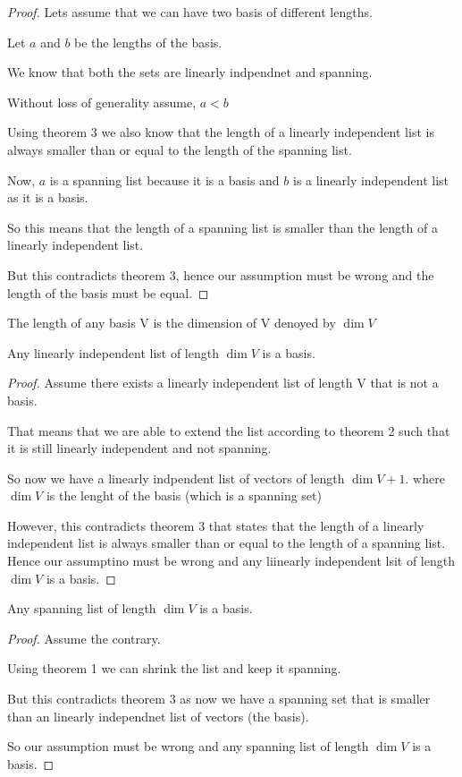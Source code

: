     \begin{proof}
        Lets assume that we can have two basis of different lengths.

        Let $a$ and $b$ be the lengths of the basis.

        We know that both the sets are linearly indpendnet and spanning. 

        Without loss of generality assume, $a < b$
        
        Using theorem 3 we also know that the length of a linearly independent list is always smaller than or equal to the length of the spanning list.

        Now, $a$ is a spanning list because it is a basis and  $b$ is a linearly independent list as it is a basis.

        So this means that the length of a spanning list is smaller than the length of a linearly independent list.

        But this contradicts theorem 3, hence our assumption must be wrong and the length of the basis must be equal.
    \end{proof}

\begin{definition}
    The length of any basis V is the dimension of V denoyed by $\dim V$
\end{definition}



\begin{prop}
    Any linearly independent list of length $\dim V$ is a basis.
\end{prop}
\begin{proof}
    Assume there exists a linearly independent list of length \dim V that is not a basis.

    That means that we are able to extend the list according to theorem 2 such that it is still linearly independent and not spanning. 

    So now we have a linearly indpendent list of vectors of length $\dim V + 1$. where  $\dim V$ is the lenght of the basis (which is a spanning set)

    However, this contradicts theorem 3 that states that the length of a linearly independent list is always smaller than or equal to the length of a spanning list. Hence our assumptino must be wrong and any liinearly independent lsit of length  $\dim V$ is a basis.
\end{proof}

\begin{prop}
    Any spanning list of length $\dim V$ is a basis.
\end{prop}
\begin{proof}
    Assume the contrary.

    Using theorem 1 we can shrink the list and keep it spanning. 

    But this contradicts theorem 3 as now we have a spanning set that is smaller than an linearly independnet list of vectors (the basis).

    So our assumption must be wrong and any spanning list of length $\dim V$ is a basis.
\end{proof}

